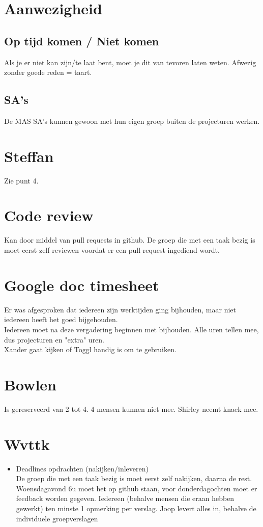 \documentclass{article}
\begin{document}
\section{Aanwezigheid}
\subsection{Op tijd komen / Niet komen}
Als je er niet kan zijn/te laat bent, moet je dit van tevoren laten weten. Afwezig zonder goede reden = taart.

\subsection{SA's}
De MAS SA's kunnen gewoon met hun eigen groep buiten de projecturen werken.

\section{Steffan}
Zie punt 4.

\section{Code review}
Kan door middel van pull requests in github. De groep die met een taak bezig is moet eerst zelf reviewen voordat er een pull request ingediend wordt.

\section{Google doc timesheet}
Er was afgesproken dat iedereen zijn werktijden ging bijhouden, maar niet iedereen heeft het goed bijgehouden.\\
Iedereen moet na deze vergadering beginnen met bijhouden. Alle uren tellen mee, dus projecturen en "extra" uren.\\
Xander gaat kijken of Toggl handig is om te gebruiken.

\section{Bowlen}
Is gereserveerd van 2 tot 4. 4 mensen kunnen niet mee. Shirley neemt knaek mee.

\section{Wvttk}
\begin{itemize}
\item Deadlines opdrachten (nakijken/inleveren)\\
De groep die met een taak bezig is moet eerst zelf nakijken, daarna de rest.
Woensdagavond 6u moet het op github staan, voor donderdagochten moet er feedback worden gegeven.
Iedereen (behalve mensen die eraan hebben gewerkt) ten minste 1 opmerking per verslag. Joop levert alles in, behalve de individuele groepverslagen
\end{itemize}
\end{document}
